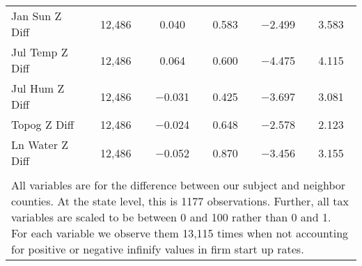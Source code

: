 \begin{table}[!htbp]
\begin{tabular}{@{\extracolsep{5pt}}lccccc}
Jan Sun Z Diff & 12,486 & 0.040 & 0.583 & $-$2.499 & 3.583 \\ 
Jul Temp Z Diff & 12,486 & 0.064 & 0.600 & $-$4.475 & 4.115 \\ 
Jul Hum Z Diff & 12,486 & $-$0.031 & 0.425 & $-$3.697 & 3.081 \\ 
Topog Z Diff & 12,486 & $-$0.024 & 0.648 & $-$2.578 & 2.123 \\ 
Ln Water Z Diff & 12,486 & $-$0.052 & 0.870 & $-$3.456 & 3.155 \\ 
\hline \\[-1.8ex] 
\multicolumn{6}{l}{All variables are for the difference between our subject and neighbor counties. At the state level, this is 1177 observations. Further, all tax variables are scaled to be between 0 and 100 rather than 0 and 1. For each variable we observe them 13,115 times when not accounting for positive or negative infinify values in firm start up rates.} \\ 
\end{tabular} 
\end{table} 
